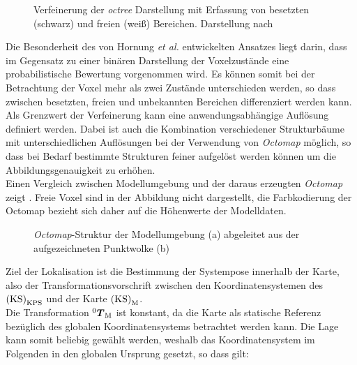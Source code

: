\begin{figure}[!ht]
	\begin{center}
	\hspace{5mm}
	\caption{Verfeinerung der \textit{octree} Darstellung mit Erfassung von besetzten (schwarz) und freien (weiß) Bereichen. Darstellung nach \cite{Hornung2013} }
	\label{fig.octree}
	\end{center}
\end{figure}

Die Besonderheit des von Hornung \textit{et al.} entwickelten Ansatzes liegt darin, dass im Gegensatz zu einer binären Darstellung der Voxelzustände eine probabilistische Bewertung vorgenommen wird. Es können somit bei der Betrachtung der Voxel mehr als zwei Zustände unterschieden werden, so dass zwischen besetzten, freien und unbekannten Bereichen differenziert werden kann. Als Grenzwert der Verfeinerung kann eine anwendungsabhängige Auflösung definiert werden. Dabei ist auch die Kombination verschiedener Strukturbäume mit unterschiedlichen Auflösungen bei der Verwendung von \textit{Octomap} möglich, so dass bei Bedarf bestimmte Strukturen feiner aufgelöst werden können um die Abbildungsgenauigkeit zu erhöhen.\\
Einen Vergleich zwischen Modellumgebung und der daraus erzeugten \textit{Octomap} zeigt . Freie Voxel sind in der Abbildung nicht dargestellt, die Farbkodierung der Octomap bezieht sich daher auf die Höhenwerte der Modelldaten.\\

\begin{figure}[!ht]
	\begin{center}
	\hspace{5mm}
	\caption{\textit{Octomap}-Struktur der Modellumgebung (a) abgeleitet aus der aufgezeichneten Punktwolke (b)}
	\label{fig.octomap}
	\end{center}
\end{figure}%

Ziel der Lokalisation ist die Bestimmung der Systempose innerhalb der Karte, also der Transformationsvorschrift zwischen den Koordinatensystemen des  ${\mathrm{(KS)}}_{\mathrm{KPS}}$ und der Karte ${\mathrm{(KS)}}_{\mathrm{M}}$.\\
Die Transformation ${^{\mathrm{0}}\mbox{\boldmath{$T$}}_{\mathrm{M}}}$ ist konstant, da die Karte als statische Referenz bezüglich des globalen Koordinatensystems betrachtet werden kann. Die Lage kann somit beliebig gewählt werden, weshalb das Koordinatensystem im Folgenden in den globalen Ursprung gesetzt, so dass gilt:

